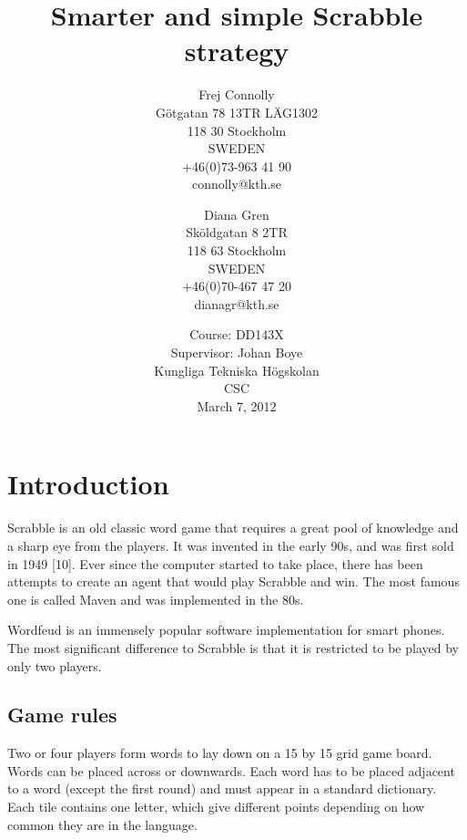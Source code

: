 \documentclass[a4paper, 12pt]{report}
\begin{document}
\title{Smarter and simple Scrabble strategy}
\date{Course: DD143X \\ Supervisor: Johan Boye \\ Kungliga Tekniska Högskolan \\ CSC \\ March 7, 2012}
\author{Frej Connolly \\ Götgatan 78 13TR LÄG1302 \\ 118 30 Stockholm \\ SWEDEN \\ +46(0)73-963 41 90 \\ connolly@kth.se \\
        \and Diana Gren \\ Sköldgatan 8 2TR \\ 118 63 Stockholm \\ SWEDEN \\ +46(0)70-467 47 20 \\ dianagr@kth.se}

\maketitle
\tableofcontents


\chapter{Introduction}
Scrabble is an old classic word game that requires a great pool of knowledge and a sharp eye from the players. It was invented in the early 90s, and was first sold in 1949 [10]. Ever since the computer started to take place, there has been attempts to create an agent that would play Scrabble and win. The most famous one is called Maven and was implemented in the 80s.

Wordfeud is an immensely popular software implementation for smart phones. The most significant difference to Scrabble is that it is restricted to be played by only two players.

\section{Game rules}
Two or four players form words to lay down on a 15 by 15 grid game board. Words can be placed across or downwards. Each word has to be placed adjacent to a word (except the first round) and must appear in a standard dictionary. Each tile contains one letter, which give different points depending on how common they are in the language. 
\end{document}

